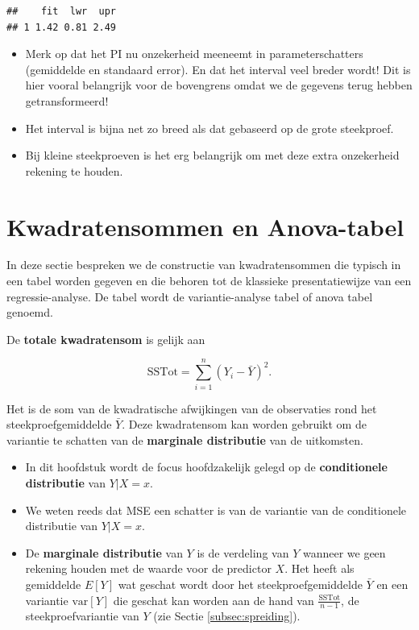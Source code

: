 \documentclass[
  12pt,dutch,coursenotes]{book}
\providecommand{\tightlist}{%
  \setlength{\itemsep}{0pt}\setlength{\parskip}{0pt}}
\theoremstyle{definition}
\theoremstyle{definition}
\theoremstyle{definition}
\theoremstyle{definition}
\theoremstyle{remark}
\begin{document}
\begin{lstlisting}
##    fit  lwr  upr
## 1 1.42 0.81 2.49
\end{lstlisting}

\begin{itemize}
\item
  Merk op dat het PI nu onzekerheid meeneemt in parameterschatters (gemiddelde en standaard error).
  En dat het interval veel breder wordt! Dit is hier vooral belangrijk voor de bovengrens omdat we de gegevens terug hebben getransformeerd!
\item
  Het interval is bijna net zo breed als dat gebaseerd op de grote steekproef.
\item
  Bij kleine steekproeven is het erg belangrijk om met deze extra onzekerheid rekening te houden.
\end{itemize}

\hypertarget{sec:linAnova}{%
\section{Kwadratensommen en Anova-tabel}\label{sec:linAnova}}

In deze sectie bespreken we de constructie van kwadratensommen die typisch in een tabel worden gegeven en die behoren tot de klassieke presentatiewijze van een regressie-analyse.
De tabel wordt de variantie-analyse tabel of anova tabel genoemd.

De \textbf{totale kwadratensom} is gelijk aan

\[\text{SSTot} = \sum_{i=1}^n (Y_i-\bar{Y})^2.\]

Het is de som van de kwadratische afwijkingen van de observaties rond het steekproefgemiddelde \(\bar Y\).
Deze kwadratensom kan worden gebruikt om de variantie te schatten van de \textbf{marginale distributie} van de uitkomsten.

\begin{itemize}
\tightlist
\item
  In dit hoofdstuk wordt de focus hoofdzakelijk gelegd op de \textbf{conditionele distributie} van \(Y\vert X=x\).
\item
  We weten reeds dat MSE een schatter is van de variantie van de conditionele distributie van \(Y\vert X=x\).
\item
  De \textbf{marginale distributie} van \(Y\) is de verdeling van \(Y\) wanneer we geen rekening houden met de waarde voor de predictor \(X\). Het heeft als gemiddelde \(E[Y]\) wat geschat wordt door het steekproefgemiddelde \(\bar{Y}\) en een variantie \(\text{var}[Y]\) die geschat kan worden aan de hand van \(\frac{\text{SSTot}}{n-1}\), de steekproefvariantie van \(Y\) (zie Sectie \ref{subsec:spreiding}).
\end{itemize}
\end{document}

